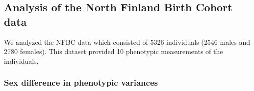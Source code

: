 \documentclass[11pt]{article}
\begin{document}

\subsection{Analysis of the North Finland Birth Cohort data} 

We analyzed the NFBC data \citep{Sabatti:NatGenet:2009}
which consisted of 5326 individuals (2546 males and 2780 females). This dataset provided
10 phenotypic measurements of the individuals.

\subsubsection*{Sex difference in phenotypic variances}
\end{document}
